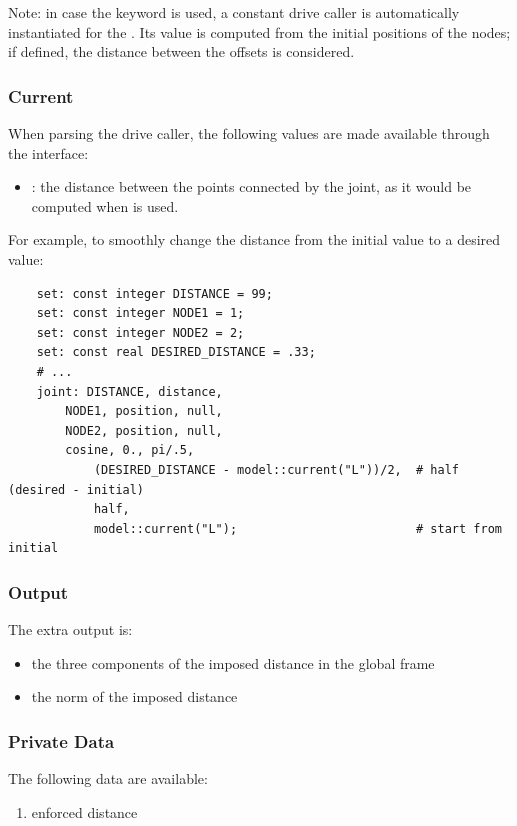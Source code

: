 Note: in case the keyword  is used, a constant drive
caller is automatically instantiated for the . 
Its value is computed from the initial positions of the nodes;
if defined, the distance between the offsets is considered. 



\subsubsection{Current}
When parsing the drive caller, the following values are made available
through the  interface:
\begin{itemize}
\item
{}: 
the distance between the points connected by the joint,
as it would be computed when  is used.
\end{itemize}
For example, to smoothly change the distance from the initial value to a desired value:
\begin{verbatim}
    set: const integer DISTANCE = 99;
    set: const integer NODE1 = 1;
    set: const integer NODE2 = 2;
    set: const real DESIRED_DISTANCE = .33;
    # ...
    joint: DISTANCE, distance,
        NODE1, position, null,
        NODE2, position, null,
        cosine, 0., pi/.5,
            (DESIRED_DISTANCE - model::current("L"))/2,  # half (desired - initial)
            half,
            model::current("L");                         # start from initial
\end{verbatim}



\subsubsection{Output}
The extra output is:
\begin{itemize}
    \item the three components of the imposed distance in the global frame
    \item the norm of the imposed distance
\end{itemize}

\subsubsection{Private Data}
The following data are available:
\begin{enumerate}
\item {} enforced distance
\end{enumerate}

